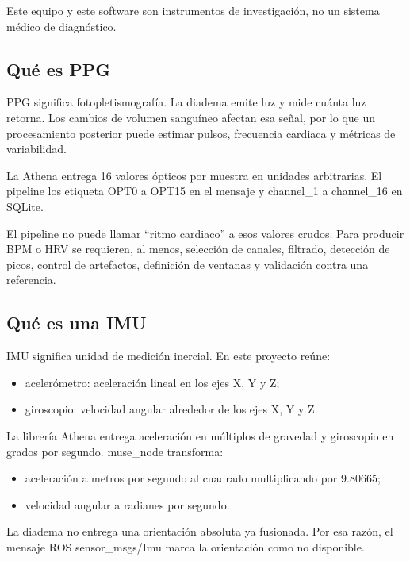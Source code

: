\documentclass[11pt,a4paper]{article}
\begin{document}
Este equipo y este software son instrumentos de investigación, no un sistema médico de diagnóstico.

\subsection{Qué es PPG}

PPG significa fotopletismografía. La diadema emite luz y mide cuánta luz retorna. Los cambios de volumen sanguíneo afectan esa señal, por lo que un procesamiento posterior puede estimar pulsos, frecuencia cardiaca y métricas de variabilidad.

La Athena entrega 16 valores ópticos por muestra en unidades arbitrarias. El pipeline los etiqueta {\ttfamily\small OPT0} a {\ttfamily\small OPT15} en el mensaje y {\ttfamily\small channel\_1} a {\ttfamily\small channel\_16} en SQLite.

El pipeline no puede llamar “ritmo cardiaco” a esos valores crudos. Para producir BPM o HRV se requieren, al menos, selección de canales, filtrado, detección de picos, control de artefactos, definición de ventanas y validación contra una referencia.

\subsection{Qué es una IMU}

IMU significa unidad de medición inercial. En este proyecto reúne:

\begin{itemize}
\item acelerómetro: aceleración lineal en los ejes X, Y y Z;
\item giroscopio: velocidad angular alrededor de los ejes X, Y y Z.
\end{itemize}

La librería Athena entrega aceleración en múltiplos de gravedad y giroscopio en grados por segundo. {\ttfamily\small muse\_node} transforma:

\begin{itemize}
\item aceleración a metros por segundo al cuadrado multiplicando por {\ttfamily\small 9.80665};
\item velocidad angular a radianes por segundo.
\end{itemize}

La diadema no entrega una orientación absoluta ya fusionada. Por esa razón, el mensaje ROS {\ttfamily\small sensor\_msgs/Imu} marca la orientación como no disponible.
\end{document}
